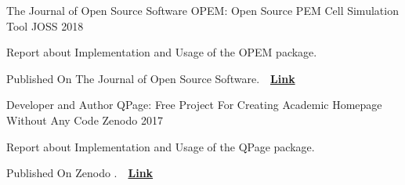 \begin{cventries}
  \cventry
    {The Journal of Open Source Software} %
    {OPEM: Open Source PEM Cell Simulation Tool} %
    {JOSS} %
    {2018} %
    {
      \begin{cvitems} %
        \item {Report about Implementation and Usage of the OPEM package.}
        \item {Published On The Journal of Open Source Software.~~\href{https://www.theoj.org/joss-papers/joss.00676/10.21105.joss.00676.pdf}{\textbf{Link}}}
      \end{cvitems}
    }

  \cventry
    {Developer and Author} %
    {QPage: Free Project For Creating Academic Homepage Without Any Code} %
    {Zenodo} %
    {2017} %
    {
      \begin{cvitems} %
        \item {Report about Implementation and Usage of the QPage package.}
        \item {Published On Zenodo .~~\href{http://doi.org/10.5281/zenodo.265544}{\textbf{Link}}}
      \end{cvitems}
    }
% 
\end{cventries}
